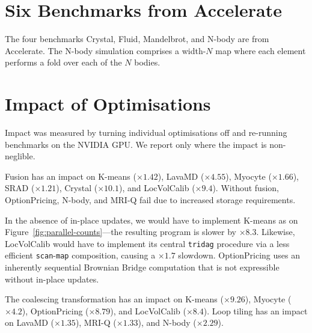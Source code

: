 \section{Six Benchmarks from Accelerate}
\label{sec:accelerate}

The four benchmarks Crystal, Fluid, Mandelbrot, and N-body are from
Accelerate.  The N-body simulation comprises a width-$N$ map where
each element performs a fold over each of the $N$ bodies.

\section{Impact of Optimisations}

Impact was measured by turning individual optimisations off and
re-running benchmarks on the NVIDIA GPU.  We report only where
the impact is non-neglible.

Fusion has an impact on K-means ($\times1.42$), LavaMD
($\times4.55$), Myocyte ($\times1.66$), SRAD ($\times1.21$), Crystal
($\times10.1$), and LocVolCalib ($\times9.4$).  Without fusion,
OptionPricing, N-body, and MRI-Q fail due to increased
storage requirements.

In the absence of in-place updates, we would have to implement
K-means as on Figure~\ref{fig:parallel-counts}---the resulting
program is slower by $\times8.3$.  Likewise, LocVolCalib
would have to implement its central \lstinline{tridag} procedure via a
less efficient \lstinline{scan}-\lstinline{map} composition, causing a
$\times1.7$ slowdown.  OptionPricing uses an inherently sequential
Brownian Bridge computation that is not expressible without in-place
updates.

The coalescing transformation has an impact on K-means
($\times9.26$), Myocyte ($\times4.2$), OptionPricing ($\times 8.79$),
and LocVolCalib ($\times 8.4$).
%
Loop tiling has an impact on LavaMD ($\times 1.35$), MRI-Q
($\times1.33$), and N-body ($\times 2.29$).


